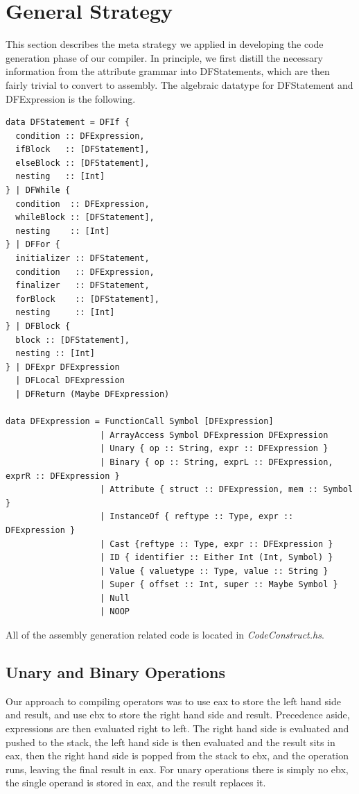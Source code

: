 \documentclass[12pt,letterpaper]{article}
\begin{document}
\section{General Strategy}
This section describes the meta strategy we applied in developing the code generation phase of our compiler.
In principle, we first distill the necessary information from the attribute grammar into DFStatements, which are then fairly trivial to convert to assembly.
The algebraic datatype for DFStatement and DFExpression is the following.
\begin{lstlisting}
data DFStatement = DFIf {
  condition :: DFExpression,
  ifBlock   :: [DFStatement],
  elseBlock :: [DFStatement],
  nesting   :: [Int]
} | DFWhile {
  condition  :: DFExpression,
  whileBlock :: [DFStatement],
  nesting    :: [Int]
} | DFFor {
  initializer :: DFStatement,
  condition   :: DFExpression,
  finalizer   :: DFStatement,
  forBlock    :: [DFStatement],
  nesting     :: [Int]
} | DFBlock {
  block :: [DFStatement],
  nesting :: [Int]
} | DFExpr DFExpression
  | DFLocal DFExpression
  | DFReturn (Maybe DFExpression)

data DFExpression = FunctionCall Symbol [DFExpression]
                   | ArrayAccess Symbol DFExpression DFExpression
                   | Unary { op :: String, expr :: DFExpression }
                   | Binary { op :: String, exprL :: DFExpression, exprR :: DFExpression }
                   | Attribute { struct :: DFExpression, mem :: Symbol }
                   | InstanceOf { reftype :: Type, expr :: DFExpression }
                   | Cast {reftype :: Type, expr :: DFExpression }
                   | ID { identifier :: Either Int (Int, Symbol) }
                   | Value { valuetype :: Type, value :: String }
                   | Super { offset :: Int, super :: Maybe Symbol }
                   | Null
                   | NOOP
\end{lstlisting}
All of the assembly generation related code is located in \emph{CodeConstruct.hs}.

\subsection{Unary and Binary Operations}
Our approach to compiling operators was to use eax to store the left hand side and result, and use ebx to store the right hand side and result.
Precedence aside, expressions are then evaluated right to left.
The right hand side is evaluated and pushed to the stack, the left hand side is then evaluated and the result sits in eax, then the right hand side is popped from the stack to ebx, and the operation runs, leaving the final result in eax.
For unary operations there is simply no ebx, the single operand is stored in eax, and the result replaces it.
\end{document}
